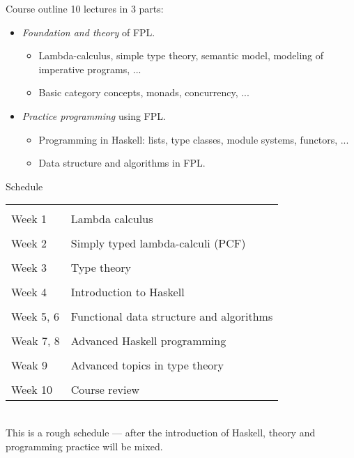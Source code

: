 \documentclass{beamer}
\begin{document}
\begin{frame}{Course outline}
10 lectures in 3 parts:
\begin{itemize}
\item \emph{Foundation and theory} of FPL.
\begin{itemize}
\item Lambda-calculus, simple type theory, semantic model, modeling of imperative programs, ...
\item Basic category concepts, monads, concurrency, ...
\end{itemize}
\item \emph{Practice programming} using FPL.
\begin{itemize}
\item Programming in Haskell: lists, type classes, module systems, functors, ...
\item Data structure and algorithms in FPL.
\end{itemize}
\end{itemize}
\end{frame}

\begin{frame}{Schedule}
\hspace*{4em}
\begin{tabular}[b]{l || l }
\hline \\[-1em]
Week 1 & Lambda calculus
\\[0.2em] \hline \\[-1em]
Week 2  & Simply typed lambda-calculi (PCF)
\\[0.2em] \hline \\[-1em]
Week 3 & Type theory 
\\[0.2em] \hline \\[-1em]
Week 4 & Introduction to Haskell 
\\[0.2em] \hline \\[-1em]
Week 5, 6 & Functional data structure and algorithms
\\[0.2em] \hline \\[-1em]
Weak 7, 8 & Advanced Haskell programming 
\\[0.2em] \hline \\[-1em]
Weak 9 & Advanced topics in type theory
\\[0.2em] \hline \\[-1em]
Week 10 & Course review
\\[0.2em] \hline 
\end{tabular}
\\
This is a rough schedule --- after the introduction of Haskell, theory and programming practice will be mixed.
\end{frame}
\end{document}
